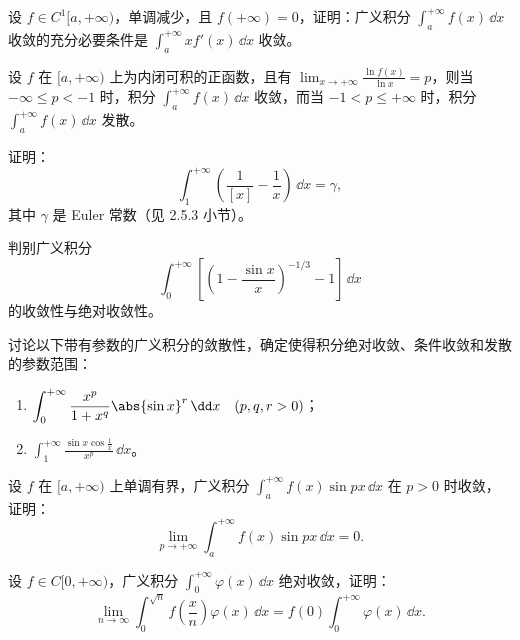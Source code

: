 \begin{xreferenceproblem}[5]
设 $f\in C^1[a,+\infty)$，单调减少，且 $f(+\infty)=0$，证明：广义积分 $\int_a^{+\infty}f(x)\,\dd x$ 收敛的充分必要条件是 $\int_a^{+\infty}xf'(x)\,\dd x$ 收敛。
\end{xreferenceproblem}

\begin{xreferenceproblem}[6]
设 $f$ 在 $[a,+\infty)$ 上为内闭可积的正函数，且有 $\lim_{x\to+\infty}\frac{\ln f(x)}{\ln x}=p$，则当 $-\infty\leq p<-1$ 时，积分 $\int_a^{+\infty}f(x)\,\dd x$ 收敛，而当 $-1<p\leq+\infty$ 时，积分 $\int_a^{+\infty}f(x)\,\dd x$ 发散。
\end{xreferenceproblem}

\begin{xreferenceproblem}[7]
证明：
  \[
    \int_1^{+\infty}\left(\frac1{[x]}-\frac1x\right)\,\dd x=\gamma,
  \]
  其中 $\gamma$ 是 Euler 常数（见 2.5.3 小节）。
\end{xreferenceproblem}

\begin{xreferenceproblem}[8]
判别广义积分
  \[
    \int_0^{+\infty}\left[\left(1-\frac{\sin x}{x}\right)^{-1/3}-1\right]\,\dd x
  \]
  的收敛性与绝对收敛性。
\end{xreferenceproblem}

\begin{xreferenceproblem}[9]
讨论以下带有参数的广义积分的敛散性，确定使得积分绝对收敛、条件收敛和发散的参数范围：
  \begin{enumerate}[label=(\arabic*)]
    \item $\displaystyle\int_0^{+\infty}\frac{x^p}{1+x^q}\abs{\sin x}^r\,\dd x\quad(p,q,r>0)$；
    \item $\displaystyle\int_1^{+\infty}\frac{\sin x\cos\frac1x}{x^p}\,\dd x$。
  \end{enumerate}
\end{xreferenceproblem}

\begin{xreferenceproblem}[10]
设 $f$ 在 $[a,+\infty)$ 上单调有界，广义积分 $\int_a^{+\infty}f(x)\sin px\,\dd x$ 在 $p>0$ 时收敛，证明：
  \[
    \lim_{p\to+\infty}\int_a^{+\infty}f(x)\sin px\,\dd x=0.
  \]
\end{xreferenceproblem}

\begin{xreferenceproblem}[11]
设 $f\in C[0,+\infty)$，广义积分 $\int_0^{+\infty}\varphi(x)\,\dd x$ 绝对收敛，证明：
  \[
    \lim_{n\to\infty}\int_0^{\sqrt n}f\left(\frac xn\right)\varphi(x)\,\dd x
    =f(0)\int_0^{+\infty}\varphi(x)\,\dd x.
  \]
\end{xreferenceproblem}

